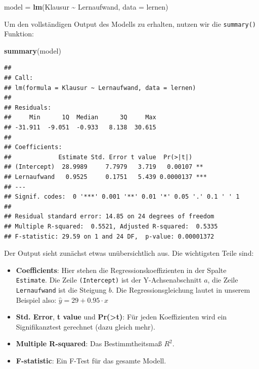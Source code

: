 \documentclass[
]{book}
\newenvironment{Shaded}{\begin{snugshade}}{\end{snugshade}}
\newcommand{\AttributeTok}[1]{\textcolor[rgb]{0.13,0.29,0.53}{#1}}
\newcommand{\FunctionTok}[1]{\textcolor[rgb]{0.13,0.29,0.53}{\textbf{#1}}}
\newcommand{\NormalTok}[1]{#1}
\newcommand{\OtherTok}[1]{\textcolor[rgb]{0.56,0.35,0.01}{#1}}
\newcommand{\SpecialCharTok}[1]{\textcolor[rgb]{0.81,0.36,0.00}{\textbf{#1}}}
\providecommand{\tightlist}{%
  \setlength{\itemsep}{0pt}\setlength{\parskip}{0pt}}
\begin{document}
\begin{Shaded}
\begin{Highlighting}[]
\NormalTok{model }\OtherTok{=} \FunctionTok{lm}\NormalTok{(Klausur }\SpecialCharTok{\textasciitilde{}}\NormalTok{ Lernaufwand, }\AttributeTok{data =}\NormalTok{ lernen)}
\end{Highlighting}
\end{Shaded}

Um den vollständigen Output des Modells zu erhalten, nutzen wir die \texttt{summary()} Funktion:

\begin{Shaded}
\begin{Highlighting}[]
\FunctionTok{summary}\NormalTok{(model)}
\end{Highlighting}
\end{Shaded}

\begin{verbatim}
## 
## Call:
## lm(formula = Klausur ~ Lernaufwand, data = lernen)
## 
## Residuals:
##     Min      1Q  Median      3Q     Max 
## -31.911  -9.051  -0.933   8.138  30.615 
## 
## Coefficients:
##             Estimate Std. Error t value  Pr(>|t|)    
## (Intercept)  28.9989     7.7979   3.719   0.00107 ** 
## Lernaufwand   0.9525     0.1751   5.439 0.0000137 ***
## ---
## Signif. codes:  0 '***' 0.001 '**' 0.01 '*' 0.05 '.' 0.1 ' ' 1
## 
## Residual standard error: 14.85 on 24 degrees of freedom
## Multiple R-squared:  0.5521, Adjusted R-squared:  0.5335 
## F-statistic: 29.59 on 1 and 24 DF,  p-value: 0.00001372
\end{verbatim}

Der Output sieht zunächst etwas unübersichtlich aus. Die wichtigsten Teile sind:

\begin{itemize}
\tightlist
\item
  \textbf{Coefficients}: Hier stehen die Regressionskoeffizienten in der Spalte \texttt{Estimate}. Die Zeile \texttt{(Intercept)} ist der Y-Achsenabschnitt \(a\), die Zeile \texttt{Lernaufwand} ist die Steigung \(b\). Die Regressionsgleichung lautet in unserem Beispiel also: \(\hat{y}=29 + 0.95 \cdot x\)
\item
  \textbf{Std. Error}, \textbf{t value} und \textbf{Pr(\textgreater\textbar t\textbar)}: Für jeden Koeffizienten wird ein Signifikanztest gerechnet (dazu gleich mehr).
\item
  \textbf{Multiple R-squared}: Das Bestimmtheitsmaß \(R^2\).
\item
  \textbf{F-statistic}: Ein F-Test für das gesamte Modell.
\end{itemize}
\end{document}
